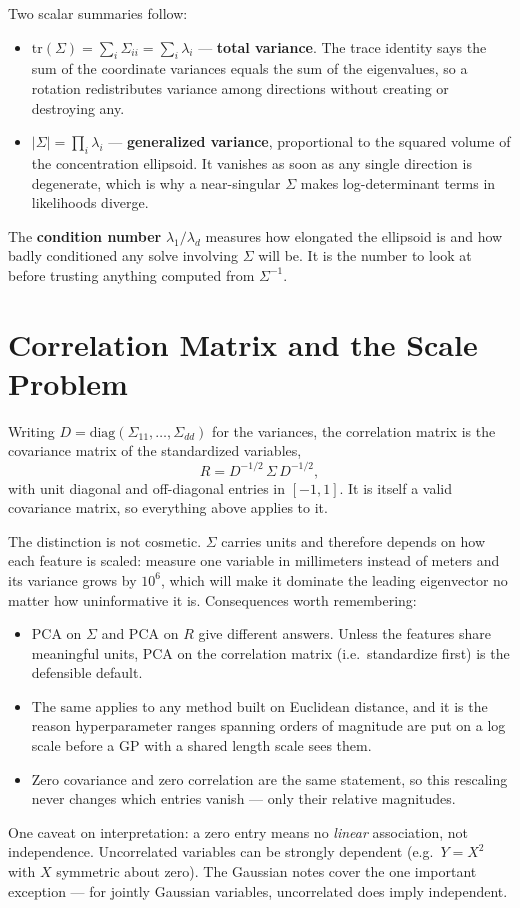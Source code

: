 \documentclass[conference]{IEEEtran}
\begin{document}
Two scalar summaries follow:
\begin{itemize}
    \item $\mathrm{tr}(\Sigma) = \sum_i \Sigma_{ii} = \sum_i \lambda_i$ --- \textbf{total variance}. The trace identity says the sum of the coordinate variances equals the sum of the eigenvalues, so a rotation redistributes variance among directions without creating or destroying any.
    \item $|\Sigma| = \prod_i \lambda_i$ --- \textbf{generalized variance}, proportional to the squared volume of the concentration ellipsoid. It vanishes as soon as any single direction is degenerate, which is why a near-singular $\Sigma$ makes log-determinant terms in likelihoods diverge.
\end{itemize}
The \textbf{condition number} $\lambda_1/\lambda_d$ measures how elongated the ellipsoid is and how badly conditioned any solve involving $\Sigma$ will be. It is the number to look at before trusting anything computed from $\Sigma^{-1}$.

\section*{Correlation Matrix and the Scale Problem}
Writing $D = \mathrm{diag}(\Sigma_{11},\dots,\Sigma_{dd})$ for the variances, the correlation matrix is the covariance matrix of the standardized variables,
\begin{equation}
    R = D^{-1/2}\,\Sigma\,D^{-1/2},
\end{equation}
with unit diagonal and off-diagonal entries in $[-1,1]$. It is itself a valid covariance matrix, so everything above applies to it.

The distinction is not cosmetic. $\Sigma$ carries units and therefore depends on how each feature is scaled: measure one variable in millimeters instead of meters and its variance grows by $10^6$, which will make it dominate the leading eigenvector no matter how uninformative it is. Consequences worth remembering:
\begin{itemize}
    \item PCA on $\Sigma$ and PCA on $R$ give different answers. Unless the features share meaningful units, PCA on the correlation matrix (i.e.\ standardize first) is the defensible default.
    \item The same applies to any method built on Euclidean distance, and it is the reason hyperparameter ranges spanning orders of magnitude are put on a log scale before a GP with a shared length scale sees them.
    \item Zero covariance and zero correlation are the same statement, so this rescaling never changes which entries vanish --- only their relative magnitudes.
\end{itemize}
One caveat on interpretation: a zero entry means no \textit{linear} association, not independence. Uncorrelated variables can be strongly dependent (e.g.\ $Y = X^2$ with $X$ symmetric about zero). The Gaussian notes cover the one important exception --- for jointly Gaussian variables, uncorrelated does imply independent.
\end{document}
